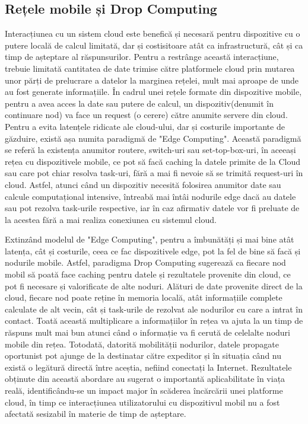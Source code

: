 \documentclass[12pt,a4paper]{report}
\begin{document}
\subsection{Rețele mobile și Drop Computing}
Interacțiunea cu un sistem cloud este benefică și necesară pentru dispozitive cu o putere locală de calcul limitată, dar și costisitoare atât ca infrastructură, cât și ca timp de așteptare al răspunsurilor. Pentru a restrânge această interacțiune, trebuie limitată cantitatea de date trimise către platformele cloud prin mutarea unor părți de prelucrare a datelor la marginea rețelei, mult mai aproape de unde au fost generate informațiile. În cadrul unei rețele formate din dispozitive mobile, pentru a avea acces la date sau putere de calcul, un dispozitiv(denumit în continuare nod) va face un request (o cerere) către anumite servere din cloud. Pentru a evita latențele ridicate ale cloud-ului, dar și costurile importante de găzduire, există așa numita paradigmă de "Edge Computing". Această paradigmă se referă la existența anumitor routere, switch-uri sau set-top-box-uri, în aceeași rețea cu dispozitivele mobile, ce pot să facă caching la datele primite de la Cloud sau care pot chiar resolva task-uri, fără a mai fi nevoie să se trimită request-uri în cloud. Astfel, atunci când un dispozitiv necesită folosirea anumitor date sau calcule computațional intensive, întreabă mai întâi nodurile edge dacă au datele sau pot rezolva task-urile respective, iar în caz afirmativ datele vor fi preluate de la acestea fără a mai realiza conexiunea cu sistemul cloud.

Extinzând modelul de "Edge Computing", pentru a îmbunătăți și mai bine atât latența, cât și costurile, ceea ce fac dispozitivele edge, pot la fel de bine să facă și nodurile mobile. Astfel, paradigma Drop Computing sugerează ca fiecare nod mobil să poată face caching pentru datele și rezultatele provenite din cloud, ce pot fi necesare și valorificate de alte noduri. Alături de date provenite direct de la cloud, fiecare nod poate reține în memoria locală, atât informațiile complete calculate de alt vecin, cât și task-urile de rezolvat ale nodurilor cu care a intrat în contact. Toată această multiplicare a informațiilor în rețea va ajuta la un timp de răspuns mult mai bun atunci când o informație va fi cerută de celelalte noduri mobile din rețea. Totodată, datorită mobilității nodurilor, datele propagate oportunist pot ajunge de la destinatar către expeditor și în situația când nu există o legătură directă între aceștia, nefiind conectați la Internet. Rezultatele obținute din această abordare au sugerat o importantă aplicabilitate în viața reală, identificându-se un impact major în scăderea încărcării unei platforme cloud, în timp ce interacțiunea utilizatorului cu dispozitivul mobil nu a fost afectată sesizabil în materie de timp de așteptare\cite{DC}.
\end{document}
